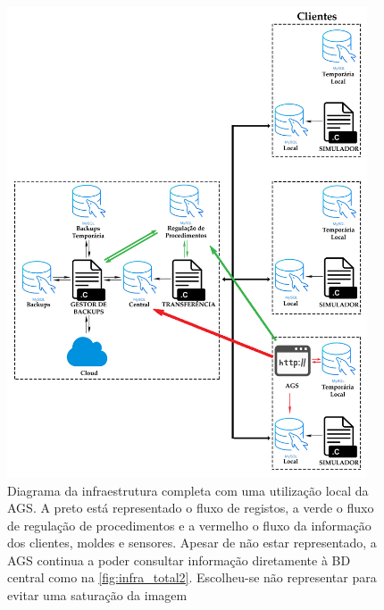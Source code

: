 \documentclass[11pt,twoside,a4paper]{report}
\begin{document}
\begin{figure}
	\vspace{0cm}
	\begin{center}
		\includegraphics[width=0.95\textwidth]{Esquema_Projeto_Total03} %
		\caption[Diagrama da infraestrutura completa com uma utilização local da AGS]{Diagrama da infraestrutura completa com uma utilização local da AGS. A preto está representado o fluxo de registos, a verde o fluxo de regulação de procedimentos e a vermelho o fluxo da informação dos clientes, moldes e sensores. Apesar de não estar representado, a AGS continua a poder consultar informação diretamente à BD central como na \autoref{fig:infra_total2}. Escolheu-se não representar para evitar uma saturação da imagem}
		\label{fig:infra_total3}
	\end{center}
\end{figure}
\end{document}
